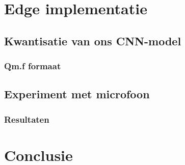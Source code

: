 \section{Edge implementatie}

\subsection{Kwantisatie van ons CNN-model}
\subsubsection{Qm.f formaat}

\subsection{Experiment met microfoon}
\subsubsection{Resultaten}


\section{Conclusie}